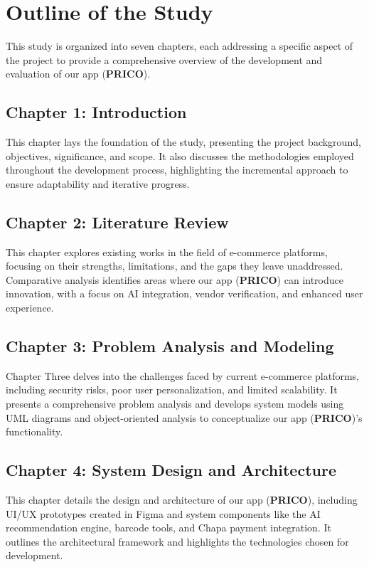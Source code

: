 \documentclass[12pt]{report}
\begin{document}
\section{Outline of the Study}

This study is organized into seven chapters, each addressing a specific aspect of the project to
provide a comprehensive overview of the development and evaluation of our app (\textbf{PRICO}).

\subsection*{Chapter 1: Introduction}

This chapter lays the foundation of the study, presenting the project background, objectives,
significance, and scope. It also discusses the methodologies employed throughout the
development process, highlighting the incremental approach to ensure adaptability and
iterative progress.

\subsection*{Chapter 2: Literature Review}

This chapter explores existing works in the field of e-commerce platforms, focusing on their
strengths, limitations, and the gaps they leave unaddressed. Comparative analysis identifies
areas where our app (\textbf{PRICO}) can introduce innovation, with a focus on AI integration,
vendor verification, and enhanced user experience.

\subsection*{Chapter 3: Problem Analysis and Modeling}

Chapter Three delves into the challenges faced by current e-commerce platforms, including
security risks, poor user personalization, and limited scalability. It presents a comprehensive
problem analysis and develops system models using UML diagrams and object-oriented
analysis to conceptualize our app (\textbf{PRICO})’s functionality.

\subsection*{Chapter 4: System Design and Architecture}

This chapter details the design and architecture of our app (\textbf{PRICO}), including UI/UX
prototypes created in Figma and system components like the AI recommendation engine,
barcode tools, and Chapa payment integration. It outlines the architectural framework and
highlights the technologies chosen for development.
\end{document}
